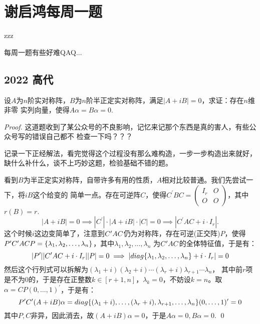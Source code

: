 \chapter{谢启鸿每周一题}

\begin{introduction}
	\item zzz
\end{introduction}

每周一题有些好难QAQ... 

\section{2022 高代 \uppercase\expandafter{}}

\begin{proposition}
    设$A$为$n$阶实对称阵，$B$为$n$阶半正定实对称阵，满足$|A+iB|=0$，求证：存在$n$维非零
    实列向量，使得$A\alpha = B \alpha = 0$.
\end{proposition}

\begin{proof}
    这道题收到了某公众号的不良影响，记忆来记那个东西是真的害人，有些公众号写的错误自己都不
    检查一下吗？？？

    记录一下正经解法，看完觉得这个过程没有那么难构造，一步一步构造出来就好，缺什么补什么，谈不上巧妙这题，检验基础不错的题。

    看到$B$为半正定实对称阵，自带许多有用的性质，$A$相对比较普通。我们先尝试一下，将$iB$这个给变的
    简单一点。存在可逆阵$C$，使得$C^\prime B C = \begin{pmatrix}
        I_r & O \\ O & O
    \end{pmatrix}$，其中$r(B)=r$.
    $$
        |A+iB|=0 \implies |C^\prime| \cdot |A+iB| \cdot |C| = 0 \implies
        |C^\prime A C + i \cdot I_r|.
    $$
    这个时候$i$这边变简单了，注意到$C^{\prime} A C $仍为对称阵，存在可逆(正交阵)$P$，使得
    $P^{\prime} C^{\prime} A C P=\{ \lambda_1, \lambda_2 , \dots, \lambda_n \}$，其中$\lambda_1,\lambda_2,\dots,\lambda_n$
    为$C^{\prime}AC$的全体特征值，于是有：
    $$
        |P^\prime| | C^{\prime} A C + i \cdot I_r| | P | = 0 \implies 
        |diag\{ \lambda_1, \lambda_2, \dots, \lambda_n \} + i \cdot I_r| = 0
    $$
    然后这个行列式可以拆解为$(\lambda_1 + i)(\lambda_2+ i) \cdots (\lambda_r + i) \lambda_{r+1} \cdots \lambda_n$，
    其中前$r$项是不为$0$的，于是存在正整数$k \in [r+1, n]$，$\lambda_{k}=0$，不妨设$k=n$。取$\alpha=
    CP(0,\dots,1)^\prime$，于是有：
    $$
        P^{\prime} C^{\prime} (A+iB) \alpha = diag\{ (\lambda_1+i),\dots,(\lambda_r+i),\lambda_{r+1},\dots,\lambda_n \}(0,\dots,1)^\prime 
        = 0
    $$
    其中$P,C$非异，因此消去，故$(A+iB)\alpha=0$，于是$A\alpha=0,B\alpha=0$.
    \qed
\end{proof}

